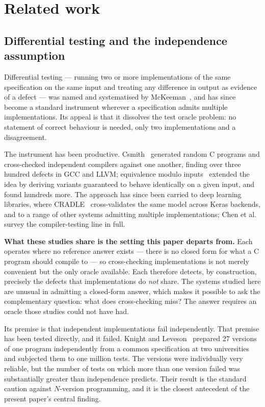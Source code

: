 \documentclass[review,12pt]{elsarticle}
\begin{document}
\section{Related work}

\subsection{Differential testing and the independence assumption}
Differential testing --- running two or more implementations of the same
specification on the same input and treating any difference in output as
evidence of a defect --- was named and systematised by
McKeeman~\cite{mckeeman1998}, and has since become a standard instrument
wherever a specification admits multiple implementations. Its appeal is that it
dissolves the test oracle problem: no statement of correct behaviour is needed,
only two implementations and a disagreement.

The instrument has been productive. Csmith~\cite{yang2011} generated random C
programs and cross-checked independent compilers against one another, finding
over three hundred defects in GCC and LLVM; equivalence modulo inputs~\cite{le2014}
extended the idea by deriving variants guaranteed to behave identically on a given
input, and found hundreds more. The approach has since been carried to deep
learning libraries, where CRADLE~\cite{pham2019} cross-validates the same model across
Keras backends, and to a range of other systems admitting multiple
implementations; Chen et al.~\cite{chen2020} survey the compiler-testing line in
full.

\textbf{What these studies share is the setting this paper departs from.} Each
operates where no reference answer exists --- there is no closed form for what a
C program should compile to --- so cross-checking implementations is not merely
convenient but the only oracle available. Each therefore detects, by
construction, precisely the defects that implementations do \emph{not} share.
The systems studied here are unusual in admitting a closed-form answer, which
makes it possible to ask the complementary question: what does cross-checking
miss? The answer requires an oracle those studies could not have had.

Its premise is that independent implementations fail independently. That premise
has been tested directly, and it failed. Knight and Leveson~\cite{knight1986}
prepared 27 versions of one program independently from a common specification at
two universities and subjected them to one million tests. The versions were
individually very reliable, but the number of tests on which more than one
version failed was substantially greater than independence predicts. Their
result is the standard caution against $N$-version programming, and it is the
closest antecedent of the present paper's central finding.
\end{document}
